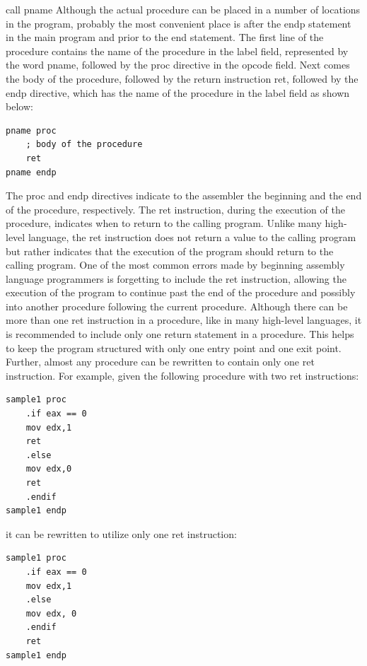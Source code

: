 \documentclass[10pt]{book}
\begin{document}
call pname
Although the actual procedure can be placed in a number of locations in the program, probably the most convenient place is after the endp statement in the main program and prior to the end statement. The first line of the procedure contains the name of the procedure in the label field, represented by the word pname, followed by the proc directive in the opcode field. Next comes the body of the procedure, followed by the return instruction ret, followed by the endp directive, which has the name of the procedure in the label field as shown below:

\begin{verbatim}
pname proc
    ; body of the procedure
    ret
pname endp
\end{verbatim}

The proc and endp directives indicate to the assembler the beginning and the end of the procedure, respectively. The ret instruction, during the execution of the procedure, indicates when to return to the calling program. Unlike many high-level language, the ret instruction does not return a value to the calling program but rather indicates that the execution of the program should return to the calling program. One of the most common errors made by beginning assembly language programmers is forgetting to include the ret instruction, allowing the execution of the program to continue past the end of the procedure and possibly into another procedure following the current procedure. Although there can be more than one ret instruction in a procedure, like in many high-level languages, it is recommended to include only one return statement in a procedure. This helps to keep the program structured with only one entry point and one exit point. Further, almost any procedure can be rewritten to contain only one ret instruction. For example, given the following procedure with two ret instructions:

\begin{verbatim}
sample1 proc
    .if eax == 0
    mov edx,1
    ret
    .else
    mov edx,0
    ret
    .endif
sample1 endp
\end{verbatim}

it can be rewritten to utilize only one ret instruction:

\begin{verbatim}
sample1 proc
    .if eax == 0
    mov edx,1
    .else
    mov edx, 0
    .endif
    ret
sample1 endp
\end{verbatim}
\end{document}
